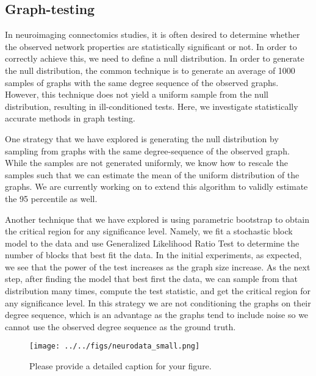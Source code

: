 \documentclass[simplex.tex]{subfiles}
\begin{document}
\subsection{Graph-testing}

In neuroimaging connectomics studies, it is often desired to determine whether the observed network properties are statistically significant or not. In order to correctly achieve this, we need to define a null distribution. In order to generate the null distribution, the common technique is to  generate an average of 1000 samples of graphs with the same degree sequence of the observed graphs. However, this technique does not yield a uniform sample from the null distribution, resulting in ill-conditioned tests. Here, we investigate statistically accurate methods in graph testing. 

One strategy that we have explored is generating the null distribution by sampling from graphs with the same degree-sequence of the observed graph. While the samples are not generated uniformly, we know how to rescale the samples such that we can estimate the mean of the uniform distribution of the graphs. We are currently working on to extend this algorithm to validly estimate the 95 percentile as well. 

Another technique that we have explored is using parametric bootstrap to obtain the critical region for any significance level. Namely, we fit a stochastic block model to the data and use Generalized Likelihood Ratio Test to determine the number of blocks that best fit the data. In the initial experiments, as expected, we see that the power of the test increases as the graph size increase. As the next step, after finding the model that best first the data, we can sample from that distribution many times, compute the test statistic, and get the critical region for any significance level. In this strategy we are not conditioning the graphs on their degree sequence, which is an advantage as the graphs tend to include noise so we cannot use the observed degree sequence as the ground truth. 

\begin{figure}[!h]
\begin{cframed}
\centering
\texttt{[image: ../../figs/neurodata\_small.png]}
\caption{Please provide a detailed caption for your figure.}
\label{fig:name}
\end{cframed}
\end{figure}
\end{document}
